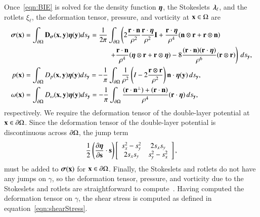 \documentclass[preprint,10pt]{elsarticle}
\begin{document}
Once~\eqref{eqn:BIE} is solved for the density function ${\boldsymbol\eta}$, the
Stokeslets ${\boldsymbol\lambda}_\ell$, and the rotlets $\xi_\ell$, the deformation
tensor, pressure, and vorticity at ${\mathbf{x}} \in \Omega$ are
\begin{align}
  \label{eqn:deformationDLP} 
  \ssigma(\xx) &= \int_{\bd\Omega} \mathbf{D}_{\ssigma}(\xx,\yy) 
      \eeta(\yy) ds_{\yy} 
  = \frac{1}{2\pi}\int_{\bd\Omega} \left(
    2\frac{\rr \cdot \nn}{\rho^2} \frac{\rr \cdot \eeta}{\rho^2} \II + 
    \frac{\rr \cdot \eeta}{\rho^4} (\nn \otimes \rr + \rr \otimes \nn) 
    \right. \nonumber \\
    & \qquad\qquad\qquad\qquad\qquad\qquad \left.
    +\frac{\rr \cdot \nn}{\rho^4} (\eeta \otimes \rr + \rr \otimes \eeta) - 
    8\frac{(\rr \cdot \nn)(\rr \cdot \eeta)}{\rho^6}(\rr \otimes \rr)
    \right) \, ds_\yy, \\
%
  p(\xx) &= \int_{\bd\Omega} D_{p}(\xx,\yy) 
      \eeta(\yy) ds_{\yy} 
  = -\frac{1}{\pi}\int_{\bd\Omega} \frac{1}{\rho^2}
    \left(I - 2 \frac{\rr \otimes \rr}{\rho^2}\right) \nn \cdot
      \eeta(\yy)\,ds_\yy, \\
%
  \label{eqn:vorticityDLP} 
  \omega(\xx) &= \int_{\bd\Omega} D_{\omega}(\xx,\yy) 
      \eeta(\yy) ds_{\yy} 
  = -\frac{1}{\pi} \int_{\bd\Omega}
    \frac{(\rr \cdot \nn^\perp) + (\rr \cdot \nn)}{\rho^4} 
      (\rr \cdot \eeta) \, ds_\yy,
\end{align}
respectively. We require the deformation tensor of the double-layer potential at
${\mathbf{x}} \in {\partial} \Omega$.  Since the deformation tensor of the double-layer
potential is discontinuous across ${\partial}\Omega$, the jump term 
\begin{align}
  \frac{1}{2} \left(\frac{\partial {\boldsymbol\eta}}{\partial {\mathbf{s}}} \cdot {\mathbf{s}} \right) \left[
    \begin{array}{cc}
      s_x^2 - s_y^2 & 2s_x s_y \\ 2s_x s_y & s_y^2 - s_x^2
    \end{array}
  \right],
  \label{eqn:deformationJump}
\end{align}
must be added to ${\boldsymbol\sigma}({\mathbf{x}})$ for ${\mathbf{x}} \in {\partial}\Omega$.  Finally, the
Stokeslets and rotlets do not have any jumps on $\gamma$, so the
deformation tensor, pressure, and vorticity due to the Stokeslets and
rotlets are straightforward to compute~\cite{poz1992}.  Having computed
the deformation tensor on $\gamma$, the shear stress is computed as
defined in equation~\eqref{eqn:shearStress}.  

\end{document}
